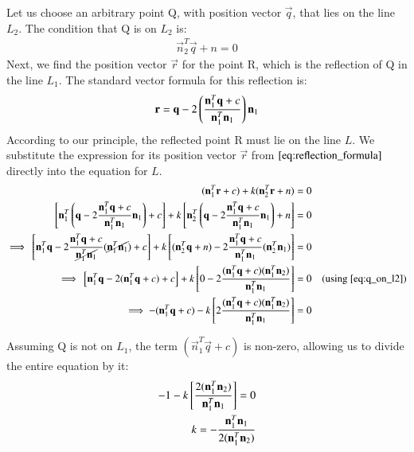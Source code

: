 \documentclass[journal]{IEEEtran}
\begin{document}
Let us choose an arbitrary point Q, with position vector $\vec{q}$, that lies on the line $L_2$. The condition that Q is on $L_2$ is:
\begin{align}
\vec{n}_2^T \vec{q} + n = 0
\label{eq:q_on_l2}
\end{align}
Next, we find the position vector $\vec{r}$ for the point R, which is the reflection of Q in the line $L_1$. The standard vector formula for this reflection is:
\begin{align}
\mathbf{r} = \mathbf{q} - 2 \left( \frac{\mathbf{n}_1^T \mathbf{q} + c}{\mathbf{n}_1^T \mathbf{n}_1} \right) \mathbf{n}_1
\label{eq:reflection_formula}
\end{align}
According to our principle, the reflected point R must lie on the line $L$. We substitute the expression for its position vector $\vec{r}$ from $\eqref{eq:reflection_formula}$ directly into the equation for $L$.
\begin{align}
(\mathbf{n}_1^T \mathbf{r} + c) + k(\mathbf{n}_2^T \mathbf{r} + n) = 0\\
     {}\left[ \mathbf{n}_1^T \left( \mathbf{q} - 2 \frac{\mathbf{n}_1^T \mathbf{q} + c}{\mathbf{n}_1^T \mathbf{n}_1} \mathbf{n}_1 \right) + c \right] + k {}\left[ \mathbf{n}_2^T \left( \mathbf{q} - 2 \frac{\mathbf{n}_1^T \mathbf{q} + c}{\mathbf{n}_1^T \mathbf{n}_1} \mathbf{n}_1 \right) + n \right] = 0 \\
    \implies  {}\left[ \mathbf{n}_1^T\mathbf{q} - 2 \frac{\mathbf{n}_1^T \mathbf{q} + c}{\cancel{\mathbf{n}_1^T \mathbf{n}_1}} (\cancel{\mathbf{n}_1^T\mathbf{n}_1}) + c \right] + k {}\left[ (\mathbf{n}_2^T \mathbf{q} + n) - 2 \frac{\mathbf{n}_1^T \mathbf{q} + c}{\mathbf{n}_1^T \mathbf{n}_1} (\mathbf{n}_2^T\mathbf{n}_1) \right] = 0 \\
    \implies  {}\left[ \mathbf{n}_1^T\mathbf{q} - 2(\mathbf{n}_1^T \mathbf{q} + c) + c \right] + k {}\left[ 0 - 2 \frac{(\mathbf{n}_1^T \mathbf{q} + c)(\mathbf{n}_1^T\mathbf{n}_2)}{\mathbf{n}_1^T \mathbf{n}_1} \right] = 0 && \text{(using \eqref{eq:q_on_l2})} \\
    \implies  -(\mathbf{n}_1^T \mathbf{q} + c) - k {}\left[ 2 \frac{(\mathbf{n}_1^T \mathbf{q} + c)(\mathbf{n}_1^T \mathbf{n}_2)}{\mathbf{n}_1^T \mathbf{n}_1} \right] = 0
\end{align}


Assuming Q is not on $L_1$, the term $(\vec{n}_1^T \vec{q} + c)$ is non-zero, allowing us to divide the entire equation by it:
\begin{align}
-1 - k {}\left[ \frac{2(\mathbf{n}_1^T \mathbf{n}_2)}{\mathbf{n}_1^T \mathbf{n}_1} \right] = 0\\
k = - \frac{\mathbf{n}_1^T \mathbf{n}_1}{2(\mathbf{n}_1^T \mathbf{n}_2)}
\end{align}
\end{document}
